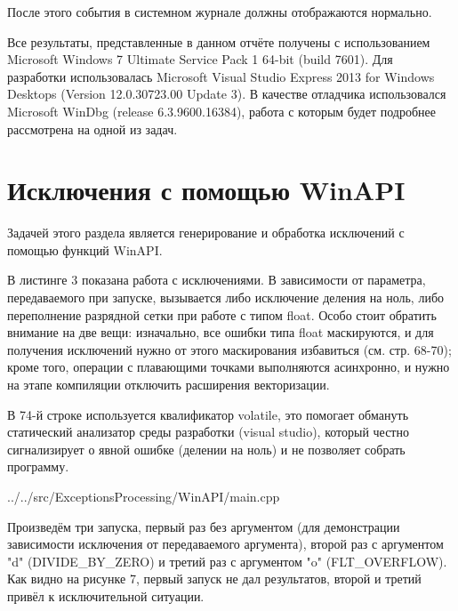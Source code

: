 \documentclass[a4paper, 12pt]{report}		%
\begin{document}
После этого события в системном журнале должны отображаются нормально.

Все результаты, представленные в данном отчёте получены с использованием Microsoft Windows 7 Ultimate Service Pack 1 64-bit (build 7601). Для разработки использовалась Microsoft Visual Studio Express 2013 for Windows Desktops (Version 12.0.30723.00 Update 3). В качестве отладчика использовался Microsoft WinDbg (release 6.3.9600.16384), работа с которым будет подробнее рассмотрена на одной из задач.


\chapter*{Исключения с помощью WinAPI}

Задачей этого раздела является генерирование и обработка исключений с помощью функций WinAPI.

В листинге 3 показана работа с исключениями. В зависимости от параметра, передаваемого при запуске, вызывается либо исключение деления на ноль, либо переполнение разрядной сетки при работе с типом float. Особо стоит обратить внимание на две вещи: изначально, все ошибки типа float маскируются, и для получения исключений нужно от этого маскирования избавиться (см. стр. 68-70); кроме того, операции с плавающими точками выполняются асинхронно, и нужно на этапе компиляции отключить расширения векторизации.

В 74-й строке используется квалификатор volatile, это помогает обмануть статический анализатор среды разработки (visual studio), который честно сигнализирует о явной ошибке (делении на ноль) и не позволяет собрать программу.


{../../src/ExceptionsProcessing/WinAPI/main.cpp}

Произведём три запуска, первый раз без аргументом (для демонстрации зависимости исключения от передаваемого аргумента), второй раз с аргументом "\-d" (DIVIDE\_BY\_ZERO) и третий раз с аргументом "\-o" (FLT\_OVERFLOW). Как видно на рисунке 7, первый запуск не дал результатов, второй и третий привёл к исключительной ситуации.
\end{document}
